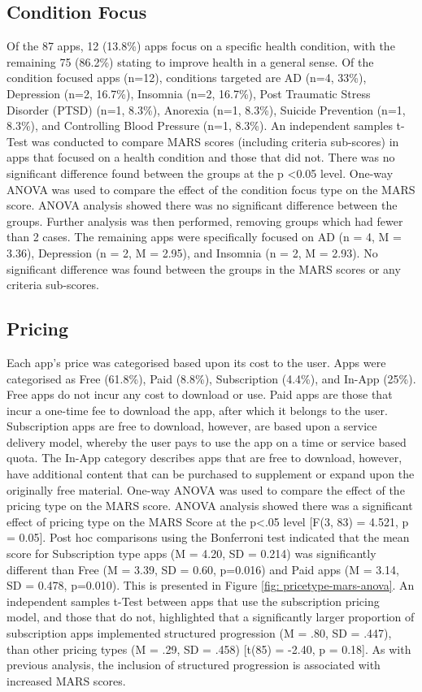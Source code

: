 \subsection{Condition Focus}
Of the 87 apps, 12 (13.8\%) apps focus on a specific health condition, with the remaining 75 (86.2\%) stating to improve health in a general sense. Of the condition focused apps (n=12), conditions targeted are AD (n=4, 33\%), Depression (n=2, 16.7\%), Insomnia (n=2, 16.7\%), Post Traumatic Stress Disorder (PTSD) (n=1, 8.3\%), Anorexia (n=1, 8.3\%), Suicide Prevention (n=1, 8.3\%), and Controlling Blood Pressure (n=1, 8.3\%). An independent samples t-Test was conducted to compare MARS scores (including criteria sub-scores) in apps that focused on a health condition and those that did not. There was no significant difference found between the groups at the p \textless 0.05 level.
One-way ANOVA was used to compare the effect of the condition focus type on the MARS score. ANOVA analysis showed there was no significant difference between the groups. Further analysis was then performed, removing groups which had fewer than 2 cases. The remaining apps were specifically focused on AD (n = 4, M = 3.36), Depression (n = 2, M = 2.95), and Insomnia (n = 2, M = 2.93). No significant difference was found between the groups in the MARS scores or any criteria sub-scores.

\subsection{Pricing}
Each app's price was categorised based upon its cost to the user. Apps were categorised as Free (61.8\%), Paid (8.8\%), Subscription (4.4\%), and In-App (25\%). Free apps do not incur any cost to download or use. Paid apps are those that incur a one-time fee to download the app, after which it belongs to the user. Subscription apps are free to download, however, are based upon a service delivery model, whereby the user pays to use the app on a time or service based quota. The In-App category describes apps that are free to download, however, have additional content that can be purchased to supplement or expand upon the originally free material.
One-way ANOVA was used to compare the effect of the pricing type on the MARS score. ANOVA analysis showed there was a significant effect of pricing type on the MARS Score at the p\textless.05 level [F(3, 83) = 4.521, p = 0.05]. Post hoc comparisons using the Bonferroni test indicated that the mean score for Subscription type apps (M = 4.20, SD = 0.214) was significantly different than Free (M = 3.39, SD = 0.60, p=0.016) and Paid apps (M = 3.14, SD = 0.478, p=0.010). This is presented in Figure \ref{fig: pricetype-mars-anova}. An independent samples t-Test between apps that use the subscription pricing model, and those that do not, highlighted that a significantly larger proportion of subscription apps implemented structured progression (M = .80, SD = .447), than other pricing types (M = .29, SD = .458) [t(85) = -2.40, p = 0.18]. As with previous analysis, the inclusion of structured progression is associated with increased MARS scores.


